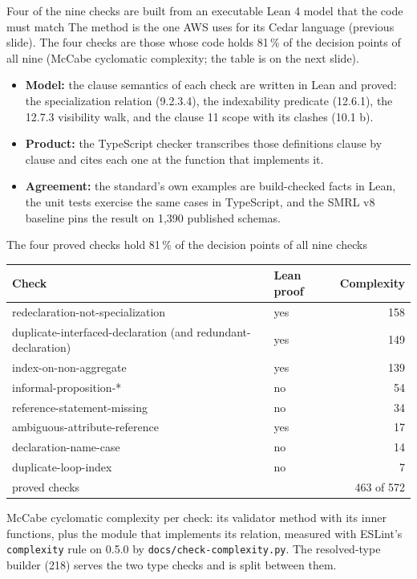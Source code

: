 \documentclass[11pt]{beamer}
\newcommand{\code}[1]{\texttt{#1}}
\begin{document}
\begin{frame}{Four of the nine checks are built from an executable Lean 4 model that the code must match}
  The method is the one AWS uses for its Cedar language (previous slide). The four checks
  are those whose code holds 81\,\% of the decision points of all nine (McCabe cyclomatic
  complexity; the table is on the next slide).
  \begin{itemize}
    \item \textbf{Model:} the clause semantics of each check are written in Lean and proved:
      the specialization relation (9.2.3.4), the indexability predicate (12.6.1), the
      12.7.3 visibility walk, and the clause 11 scope with its clashes (10.1 b).
    \item \textbf{Product:} the TypeScript checker transcribes those definitions clause by
      clause and cites each one at the function that implements it.
    \item \textbf{Agreement:} the standard's own examples are build-checked facts in Lean,
      the unit tests exercise the same cases in TypeScript, and the SMRL v8 baseline
      pins the result on 1,390 published schemas.
  \end{itemize}
\end{frame}


\begin{frame}{The four proved checks hold 81\,\% of the decision points of all nine checks}
  \footnotesize
  \setlength{\tabcolsep}{4pt}
  \begin{tabular}{@{}>{\raggedright\arraybackslash}p{6.6cm}>{\raggedright\arraybackslash}p{1.7cm}r@{}}
    \toprule
    \textbf{Check} & \textbf{Lean proof} & \textbf{Complexity} \\
    \midrule
    redeclaration-not-specialization & yes & 158 \\
    duplicate-interfaced-declaration (and redundant-declaration) & yes & 149 \\
    index-on-non-aggregate & yes & 139 \\
    informal-proposition-* & no & 54 \\
    reference-statement-missing & no & 34 \\
    ambiguous-attribute-reference & yes & 17 \\
    declaration-name-case & no & 14 \\
    duplicate-loop-index & no & 7 \\
    \midrule
    proved checks & & 463 of 572 \\
    \bottomrule
  \end{tabular}
  \medskip

  \color{sc4grey}
  McCabe cyclomatic complexity per check: its validator method with its inner functions,
  plus the module that implements its relation, measured with ESLint's \code{complexity}
  rule on 0.5.0 by \code{docs/check-complexity.py}. The resolved-type builder (218) serves
  the two type checks and is split between them.
\end{frame}
\end{document}
